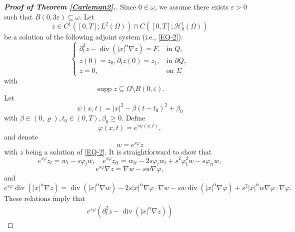 \documentclass[10pt,a4paper]{amsart}
\DeclareMathOperator{\Div}{div}
\def\Om{\Omega}
\def\al{\alpha}
\def\be{\beta}
\def\bf{\textbf}
\def\e{\varepsilon }
\def\ga{\gamma}
\def\mcH{\mathcal{H}}
\def\om{\omega}
\def\pt{\partial}
\def\s{\subseteq}
\def\se{\setminus}
\DeclareMathOperator{\supp}{{supp}}
\def\vp{\varphi}
\begin{document}
		\begin{proof}[{\rm \bf { Proof of  Theorem \ref{Carleman2}.}}]
			Since $0\in\om$, we assume there exists $\varepsilon >0$ such that  $B(0,3\varepsilon )\s\om$. Let
			\begin{equation*}
				z\in C^1([0,T]; L^2(\Om))\cap C([0,T]; \mcH_0^1(\Om))
			\end{equation*}
			be a solution of the following adjoint system (i.e., \eqref{EQ-2}):
			\begin{equation*}
				\begin{cases}
					\pt_t^2z-\Div\left(|x|^\al \nabla z\right)=F, & \mbox{in } Q,\\
					z(0)=z_0, \pt_tz(0)=z_1, &\mbox{in }\pt Q,\\
					z=0, &\mbox{on }\Sigma
				\end{cases}
			\end{equation*}
			with
			\begin{equation}\label{*}
				\supp z\s \Om\se B(0,\e).
			\end{equation}
			Let
			\begin{equation*}
				\psi(x,t)=|x|^2-\be(t-t_0)^2+\be_0
			\end{equation*}
			with $\be\in (0,\varrho), t_0\in (0,T),\be_0\geq 0$. Define
			\begin{equation}\label{vp}
				\vp(x,t)=e^{\ga\psi(x,t)},
			\end{equation}
			and denote
			\begin{equation*}
				w=e^{s\vp}z
			\end{equation*}
			with $z$ being  a solution of \eqref{EQ-2}. It is straightforward to show that
			\begin{equation*}
				e^{s\vp}z_t=w_t-s\vp_tw, \quad e^{s\vp}z_{tt}=w_{tt}-2s\vp_tw_t+s^2\vp_t^2w-s\vp_{tt}w,
			\end{equation*}
			\begin{equation*}
				e^{s\vp}\nabla z=\nabla w-sw\nabla\vp,
			\end{equation*}
			and
			\begin{equation*}
				e^{s\vp}\Div(|x|^\al \nabla z)=\Div\left(|x|^\al \nabla w\right)-2s|x|^\al \nabla \vp\cdot \nabla w-sw\Div\left(|x|^\al \nabla\vp\right)+s^2|x|^\al w\nabla\vp\cdot \nabla\vp.
			\end{equation*}
			These relations imply that
			\begin{equation*}
				\begin{split}
					e^{s\vp}\left(\pt_t^2z-\Div\left(|x|^\al \nabla z\right)\right)

\end{split}
\end{equation*}
\end{proof}
\end{document}
